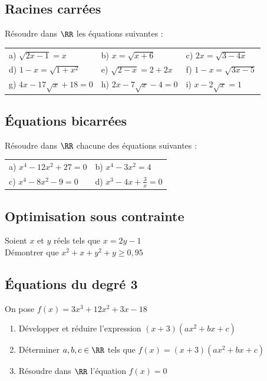 \documentclass[oneside,12pt]{book}          %
\begin{document}
\subsection{Racines carrées}
Résoudre dans $\RR$ les équations suivantes :\\
\renewcommand{\arraystretch}{1.4}
\begin{tabular}{p{} p{} p{} }
    a) $\sqrt{2x-1}=x$ &  b) $x=\sqrt{x+6} $ & c) $2x=\sqrt{3-4x}$ \\
    d) $1-x=\sqrt{1+x^{2}}$ & e) $\sqrt{2-x}=2+2x$ & f) $1-x=\sqrt{3x-5}$\\
    g) $4x-17\sqrt{x}+18=0$ & h) $2x-7\sqrt{x}-4=0$ & i) $x-2\sqrt{x}=1$
\end{tabular}



\subsection{Équations bicarrées}
Résoudre dans $\RR$ chacune des équations suivantes :\\
\begin{tabular}{p{} p{} }
    a) $x^{4}-12x^{2}+27=0$ &  b) $x^{4}-3x^{2} = 4 $ \\
    c) $x^{4}-8x^{2}-9=0$ & d) $x^{3}-4x+\frac{3}{x}=0$
\end{tabular}



\subsection{Optimisation sous contrainte}
Soient $x$ et $y$ réels tels que $x=2y-1$\\
Démontrer que $x^2+x+y^2+y\geq0,95$



\subsection{Équations du degré 3}
 On pose $f(x) = 3x^{3}+12x^{2}+3x-18 $
\begin{enumerate}
    \item Développer et réduire l'expression $(x+3)(ax^{2}+bx+c) $ 
    \item Déterminer $a,b,c\in\RR$ tels que $f(x) = (x+3)(ax^{2}+bx+c) $ 
    \item Résoudre dans $\RR$ l'équation $f(x)=0$ 
\end{enumerate} 
\end{document}
